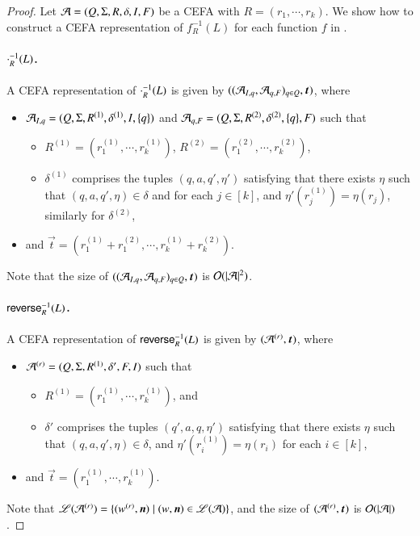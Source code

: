 \begin{proof}
Let $\mathcal{A}=(Q, \Sigma, R, \delta, I, F)$ be a CEFA with $R= (r_1, \cdots, r_k)$. We show how to construct a CEFA representation of $f^{-1}_R(L)$ for each function $f$ in {\slint}.

\paragraph*{$\cdot^{-1}_R(L)$.}
%
A CEFA representation of $\cdot^{-1}_R(L)$ is given by $((\CEFA_{I, q}, \NFA_{q, F})_{q \in Q}, \vec{t})$, where 
\begin{itemize}
\item $\mathcal{A}_{I, q}=(Q, \Sigma, R^{(1)}, \delta^{(1)}, I, \{q\})$ and  $\mathcal{A}_{q, F}=(Q, \Sigma, R^{(2)}, \delta^{(2)}, \{q\}, F)$ such that 
\begin{itemize}
\item $R^{(1)} = (r^{(1)}_1, \cdots, r^{(1)}_k)$, $R^{(2)} = (r^{(2)}_1, \cdots, r^{(2)}_k)$, 
\item $\delta^{(1)}$ comprises the tuples $(q, a, q', \eta')$ satisfying that there exists $\eta$ such that $(q, a, q', \eta) \in \delta$ and for each $j \in [k]$, and $\eta'(r^{(1)}_j)=\eta(r_j)$,  similarly for $\delta^{(2)}$,
\end{itemize}
\item and $\vec{t} = (r^{(1)}_1 + r^{(2)}_1, \cdots, r^{(1)}_k + r^{(2)}_k)$.
\end{itemize}
Note that the size of $((\CEFA_{I, q}, \NFA_{q, F})_{q \in Q}, \vec{t})$ is $\mathcal{O}(|\mathcal{A}|^2)$.
%
%
\paragraph*{$\mathsf{reverse}^{-1}_R(L)$.} 
%
A CEFA representation of $\mathsf{reverse}^{-1}_R(L)$ is given by $(\CEFA^{(r)}, \vec{t})$, where 
\begin{itemize}
\item $\mathcal{A}^{(r)}=(Q, \Sigma, R^{(1)}, \delta', F, I)$ such that 
\begin{itemize}
\item $R^{(1)}=(r^{(1)}_1,\cdots,r^{(1)}_k)$, and 
\item $\delta'$ comprises the tuples $(q', a, q, \eta')$ satisfying that there exists $\eta$ such that $(q, a, q', \eta) \in \delta$, and $\eta'(r^{(1)}_i) = \eta(r_i)$ for each $i \in [k]$,
\end{itemize}
%
\item and $\vec{t}=(r^{(1)}_1, \cdots, r^{(1)}_k)$. 
\end{itemize}
Note that $\Lang(\CEFA^{(r)}) = \{(w^{(r)}, \vec{n}) \mid (w, \vec{n}) \in \Lang(\CEFA)\}$, and the size of $(\CEFA^{(r)}, \vec{t})$ is $\mathcal{O}(|\mathcal{A}|)$.


\end{proof}
